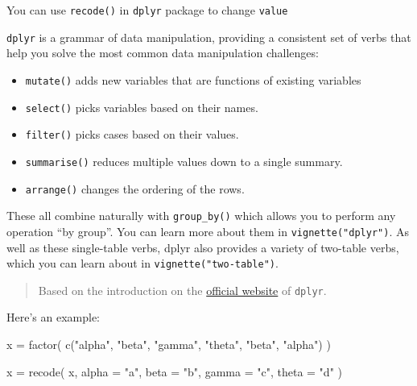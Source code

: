 \documentclass[
]{article}
\newenvironment{Shaded}{}{}
\newcommand{\AttributeTok}[1]{\textcolor[rgb]{0.49,0.56,0.16}{#1}}
\newcommand{\FunctionTok}[1]{\textcolor[rgb]{0.02,0.16,0.49}{#1}}
\newcommand{\NormalTok}[1]{#1}
\newcommand{\OtherTok}[1]{\textcolor[rgb]{0.00,0.44,0.13}{#1}}
\newcommand{\StringTok}[1]{\textcolor[rgb]{0.25,0.44,0.63}{#1}}
\begin{document}
You can use \texttt{recode()} in \texttt{dplyr} package to change
\texttt{value}

\texttt{dplyr} is a grammar of data manipulation, providing a consistent
set of verbs that help you solve the most common data manipulation
challenges:

\begin{itemize}
\item
  \texttt{mutate()} adds new variables that are functions of existing
  variables
\item
  \texttt{select()} picks variables based on their names.
\item
  \texttt{filter()} picks cases based on their values.
\item
  \texttt{summarise()} reduces multiple values down to a single summary.
\item
  \texttt{arrange()} changes the ordering of the rows.
\end{itemize}

These all combine naturally with \texttt{group\_by()} which allows you
to perform any operation ``by group''. You can learn more about them in
\texttt{vignette("dplyr")}. As well as these single-table verbs, dplyr
also provides a variety of two-table verbs, which you can learn about in
\texttt{vignette("two-table")}.

\begin{quote}
Based on the introduction on the
\href{https://dplyr.tidyverse.org}{official website} of \texttt{dplyr}.
\end{quote}

Here's an example:

\begin{Shaded}
\begin{Highlighting}[]
\NormalTok{x }\OtherTok{=}
  \FunctionTok{factor}\NormalTok{(}
    \FunctionTok{c}\NormalTok{(}\StringTok{"alpha"}\NormalTok{, }\StringTok{"beta"}\NormalTok{, }\StringTok{"gamma"}\NormalTok{, }\StringTok{"theta"}\NormalTok{, }\StringTok{"beta"}\NormalTok{, }\StringTok{"alpha"}\NormalTok{)}
\NormalTok{  )}

\NormalTok{x }\OtherTok{=}
  \FunctionTok{recode}\NormalTok{(}
\NormalTok{    x,}
    \AttributeTok{alpha =} \StringTok{"a"}\NormalTok{,}
    \AttributeTok{beta =} \StringTok{"b"}\NormalTok{,}
    \AttributeTok{gamma =} \StringTok{"c"}\NormalTok{,}
    \AttributeTok{theta =} \StringTok{"d"}
\NormalTok{  )}
\end{Highlighting}
\end{Shaded}
\end{document}

